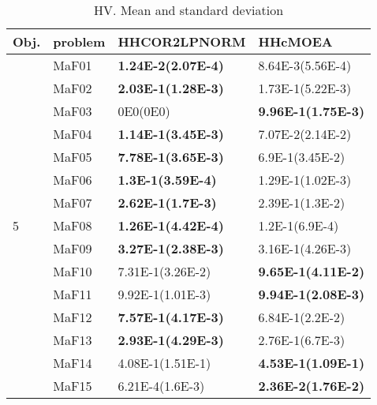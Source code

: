 \documentclass[]{article}
\begin{document}
\begin{table}
\caption{HV. Mean and standard deviation}
\label{table:mean.HV}
\centering
\begin{footnotesize}
\begin{tabular}{|l|l|l|l|}
\hline
Obj. & problem  & HHCOR2LPNORM & HHcMOEA \\ \hline

\multirow{15}{*}{5} & MaF01 & \cellcolor{gray95} {\bf 1.24E-2(2.07E-4)} & 8.64E-3(5.56E-4)\\
 & MaF02 & \cellcolor{gray95} {\bf 2.03E-1(1.28E-3)} & 1.73E-1(5.22E-3)\\
 & MaF03 & 0E0(0E0) & \cellcolor{gray95} {\bf 9.96E-1(1.75E-3)}\\
 & MaF04 & \cellcolor{gray95} {\bf 1.14E-1(3.45E-3)} & 7.07E-2(2.14E-2)\\
 & MaF05 & \cellcolor{gray95} {\bf 7.78E-1(3.65E-3)} & 6.9E-1(3.45E-2)\\
 & MaF06 & \cellcolor{gray95} {\bf 1.3E-1(3.59E-4)} & 1.29E-1(1.02E-3)\\
 & MaF07 & \cellcolor{gray95} {\bf 2.62E-1(1.7E-3)} & 2.39E-1(1.3E-2)\\
 & MaF08 & \cellcolor{gray95} {\bf 1.26E-1(4.42E-4)} & 1.2E-1(6.9E-4)\\
 & MaF09 & \cellcolor{gray95} {\bf 3.27E-1(2.38E-3)} & 3.16E-1(4.26E-3)\\
 & MaF10 & 7.31E-1(3.26E-2) & \cellcolor{gray95} {\bf 9.65E-1(4.11E-2)}\\
 & MaF11 & 9.92E-1(1.01E-3) & \cellcolor{gray95} {\bf 9.94E-1(2.08E-3)}\\
 & MaF12 & \cellcolor{gray95} {\bf 7.57E-1(4.17E-3)} & 6.84E-1(2.2E-2)\\
 & MaF13 & \cellcolor{gray95} {\bf 2.93E-1(4.29E-3)} & 2.76E-1(6.7E-3)\\
 & MaF14 & \cellcolor{gray95} 4.08E-1(1.51E-1) & \cellcolor{gray95} {\bf 4.53E-1(1.09E-1)}\\
 & MaF15 & 6.21E-4(1.6E-3) & \cellcolor{gray95} {\bf 2.36E-2(1.76E-2)}\\
\hline


\end{tabular}
\end{footnotesize}
\end{table}
\end{document}
